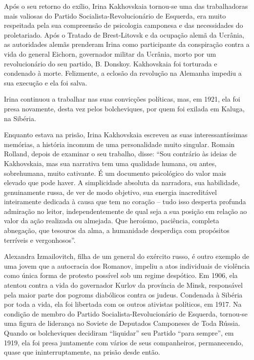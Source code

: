 Após o seu retorno do exílio, Irina Kakhovskaia tornou-se uma das
trabalhadoras mais valiosas do Partido Socialista-Revolucionário de
Esquerda, era muito respeitada pela sua compreensão de psicologia
camponesa e das necessidades do proletariado. Após o Tratado de
Brest-Litovsk e da ocupação alemã da Ucrânia, as autoridades alemãs
prenderam Irina como participante da conspiração contra a vida do
general Eichorn, governador militar da Ucrânia, morto por um
revolucionário do seu partido, B. Donskoy. Kakhovskaia foi torturada e
condenado à morte. Felizmente, a eclosão da revolução na Alemanha
impediu a sua execução e ela foi salva.

Irina continuou a trabalhar nas suas convicções políticas, mas, em 1921,
ela foi presa novamente, desta vez pelos bolcheviques, por quem foi
exilada em Kaluga, na Sibéria.

Enquanto estava na prisão, Irina Kakhovskaia escreveu as suas
interessantíssimas memórias, a história incomum de uma personalidade
muito singular. Romain Rolland, depois de examinar o seu trabalho,
disse: ``Sou contrário às ideias de Kakhovskaia, mas sua narrativa tem
uma qualidade humana, ou antes, sobrehumana, muito cativante. É um
documento psicológico do valor mais elevado que pode haver. A
simplicidade absoluta da narradora, sua habilidade, genuinamente russa,
de ver de modo objetivo, sua energia inacreditável inteiramente dedicada
à causa que tem no coração -- tudo isso desperta profunda admiração no
leitor, independentemente de qual seja a sua posição em relação ao valor
da ação realizada ou almejada. Que heroísmo, paciência, completa
abnegação, que tesouros da alma, a humanidade desperdiça com propósitos
terríveis e vergonhosos''.

Alexandra Izmailovitch, filha de um general do exército russo, é outro
exemplo de uma jovem que a autocracia dos Romanov, impeliu a atos
individuais de violência como única forma de protesto possível sob um
regime despótico. Em 1906, ela atentou contra a vida do governador
Kurlov da província de Minsk, responsável pela maior parte dos pogroms
diabólicos contra os judeus. Condenada à Sibéria por toda a vida, ela
foi libertada com os outros ativistas políticos, em 1917. Na condição de
membro do Partido Socialista-Revolucionário de Esquerda, tornou-se uma
figura de liderança no Soviete de Deputados Camponeses de Toda Rússia.
Quando os bolcheviques decidiram ``liquidar'' seu Partido ``para
sempre'', em 1919, ela foi presa juntamente com vários de seus
companheiros, permanecendo, quase que ininterruptamente, na prisão desde
então.

